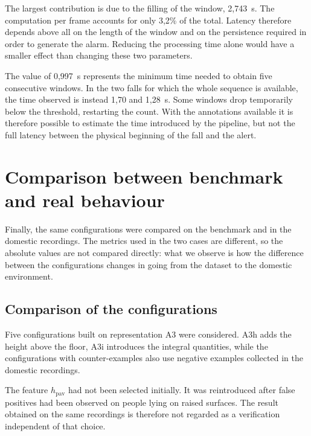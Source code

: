 The largest contribution is due to the filling of the window, 2,743~s. The computation per frame accounts for only 3,2\% of the total. Latency therefore depends above all on the length of the window and on the persistence required in order to generate the alarm. Reducing the processing time alone would have a smaller effect than changing these two parameters.

The value of 0,997~s represents the minimum time needed to obtain five consecutive windows. In the two falls for which the whole sequence is available, the time observed is instead 1,70 and 1,28~s. Some windows drop temporarily below the threshold, restarting the count.
With the annotations available it is therefore possible to estimate the time introduced by the pipeline, but not the full latency between the physical beginning of the fall and the alert.

\section{Comparison between benchmark and real behaviour}
\label{sec:rovesciamento}
\label{sec:confronto-domini}

Finally, the same configurations were compared on the benchmark and in the domestic recordings. The metrics used in the two cases are different, so the absolute values are not compared directly: what we observe is how the difference between the configurations changes in going from the dataset to the domestic environment.

\subsection{Comparison of the configurations}

Five configurations built on representation A3 were considered. A3h adds the height above the floor, A3i introduces the integral quantities, while the configurations with counter-examples also use negative examples collected in the domestic recordings.

The feature $h_{\text{pav}}$ had not been selected initially. It was reintroduced after false positives had been observed on people lying on raised surfaces. The result obtained on the same recordings is therefore not regarded as a verification independent of that choice.

